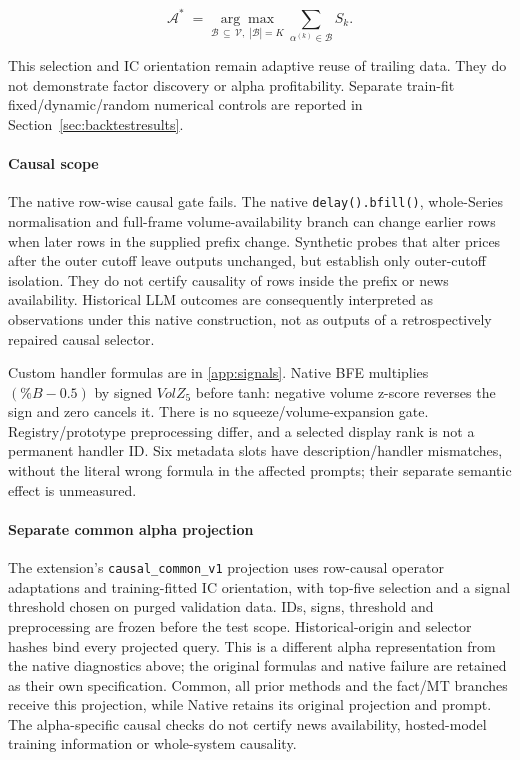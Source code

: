 \begin{equation}
    \mathcal{A}^{*} \;=\;
    \underset{\mathcal{B}\,\subseteq\,\mathcal{V},\;|\mathcal{B}|=K}
    {\arg\max}
    \;\sum_{\alpha^{(k)} \in \mathcal{B}} S_k.
    \label{eq:selection}
\end{equation}


This selection and IC orientation remain adaptive reuse of trailing data. They do not demonstrate factor discovery or alpha profitability. Separate train-fit fixed/dynamic/random numerical controls are reported in Section~\ref{sec:backtestresults}.

\paragraph{Causal scope}
The native row-wise causal gate fails. The native \texttt{delay().bfill()}, whole-Series normalisation and full-frame volume-availability branch can change earlier rows when later rows in the supplied prefix change. Synthetic probes that alter prices after the outer cutoff leave outputs unchanged, but establish only outer-cutoff isolation. They do not certify causality of rows inside the prefix or news availability. Historical LLM outcomes are consequently interpreted as observations under this native construction, not as outputs of a retrospectively repaired causal selector.

Custom handler formulas are in \ref{app:signals}. Native BFE multiplies $(\%B-0.5)$ by signed $VolZ_5$ before tanh: negative volume z-score reverses the sign and zero cancels it. There is no squeeze/volume-expansion gate. Registry/prototype preprocessing differ, and a selected display rank is not a permanent handler ID. Six metadata slots have description/handler mismatches, without the literal wrong formula in the affected prompts; their separate semantic effect is unmeasured.

\paragraph{Separate common alpha projection}
The extension's \texttt{causal\_common\_v1} projection uses row-causal operator adaptations and training-fitted IC orientation, with top-five selection and a signal threshold chosen on purged validation data. IDs, signs, threshold and preprocessing are frozen before the test scope. Historical-origin and selector hashes bind every projected query. This is a different alpha representation from the native diagnostics above; the original formulas and native failure are retained as their own specification. Common, all prior methods and the fact/MT branches receive this projection, while Native retains its original projection and prompt. The alpha-specific causal checks do not certify news availability, hosted-model training information or whole-system causality.

